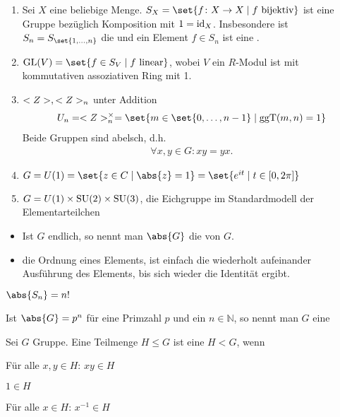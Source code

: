 \begin{example}
	\begin{enumerate}[label={\arabic*)}]
		\item Sei $X$ eine beliebige Menge. $S_X = \set{f\colon X \to X \mid f \text{ bijektiv}}$ ist eine Gruppe bezüglich Komposition mit $1 = \operatorname{id}_X$. Insbesondere ist $S_n = S_{\set{1,\dots,n}}$ die  und ein Element $f \in S_n$ ist eine .
		\item $\GL(V) = \set{f \in S_V \mid f \text{ linear}}$, wobei $V$ ein $R$-Modul ist mit kommutativen assoziativen Ring mit 1.
		\item $<Z>, <Z>_n$ unter Addition 
		\begin{align*}
			U_n = \Z^{\times}_n = \set{ m \in \set{0,\dots,n-1} \mid \ggT(m,n) = 1}
		\end{align*}
		Beide Gruppen sind abelsch, d.h. \begin{align*}
			\forall x,y \in G: xy = yx.
		\end{align*}
		\item $G = U(1) = \set{z \in C \mid \abs{z} = 1} = \set{e^{it}\mid t \in [0,2\pi]}$
		\item $G = U(1) \times \operatorname{SU}(2)\times \operatorname{SU}(3)$, die Eichgruppe im Standardmodell der Elementarteilchen  
	\end{enumerate}
\end{example}

\begin{definition}[Ordnung]
	\begin{itemize}
		\item Ist $G$ endlich, so nennt man $\abs{G}$ die  von $G$.
		\item die Ordnung eines Elements, ist einfach die wiederholt aufeinander Ausführung des Elements, bis sich wieder die Identität ergibt.
	\end{itemize}
\end{definition}

\begin{example}
	$\abs{S_n} = n!$
\end{example}

\begin{definition}[$p$-Gruppe]
	Ist $\abs{G} = p^n$ für eine Primzahl $p$ und ein $n\in\mathbb N$, so nennt man $G$ eine 
\end{definition}

\begin{definition}[Untergruppe]
	Sei $G$ Gruppe. Eine Teilmenge $H \le G$ ist eine  $H < G$, wenn
	\begin{defenum}
		\item \label{1_1_9_i} Für alle $x,y \in H$: $xy \in H$
		\item \label{1_1_9_ii} $1 \in H$
		\item \label{1_1_9_iii} Für alle $x \in H$: $x^{-1} \in H$ 
	\end{defenum}
\end{definition}

